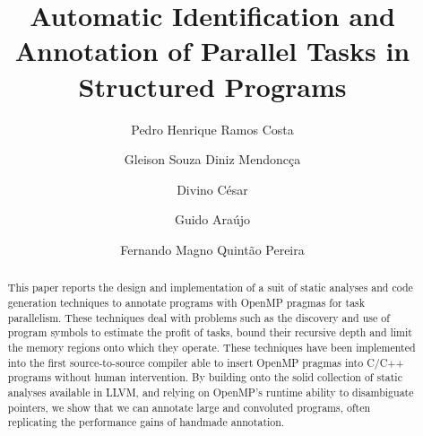 \documentclass[sigplan,10pt,review,anonymous]{acmart}
\begin{document}
\title[Automatic Identification and Annotation of Parallel Tasks in Structured
Programs]
{Automatic Identification and Annotation of Parallel Tasks in Structured Programs}

\author{Pedro Henrique Ramos Costa}

\author{Gleison Souza Diniz Mendonc\c{c}a}

\author{Divino C\'{e}sar}

\author{Guido Ara\'{u}jo}

\author{Fernando Magno Quint\~{a}o Pereira}

\begin{abstract}
This paper reports the design and implementation of a suit of static analyses
and code generation techniques to annotate programs with OpenMP pragmas for
task parallelism.
These techniques deal with problems such as the discovery and use of program
symbols to estimate the profit of tasks, bound their recursive depth and limit
the memory regions onto which they operate.
These techniques have been implemented into the first source-to-source
compiler able to insert OpenMP pragmas into C/C++ programs without human
intervention.
By building onto the solid collection of static analyses available in LLVM,
and relying on OpenMP's runtime ability to disambiguate pointers, we show that
we can annotate large and convoluted programs, often replicating the performance
gains of handmade annotation.
\end{abstract}
\end{document}
